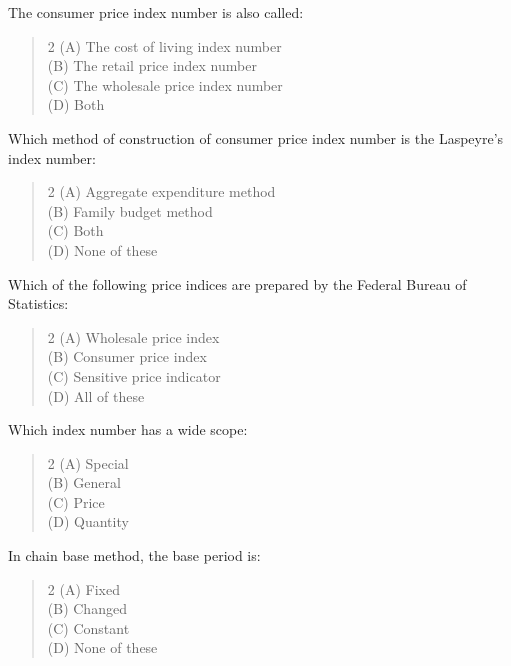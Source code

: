 \documentclass[11pt,a4paper]{article}
\begin{document}
\begin{mcqlist}
\item The consumer price index number is also called:
\begin{quote}\begin{multicols}{2}
\noindent (A) The cost of living index number \\
(B) The retail price index number \\
(C) The wholesale price index number \\
(D) Both
\end{multicols}\end{quote}

\item Which method of construction of consumer price index number is the Laspeyre's index number:
\begin{quote}\begin{multicols}{2}
\noindent (A) Aggregate expenditure method \\
(B) Family budget method \\
(C) Both \\
(D) None of these
\end{multicols}\end{quote}

\item Which of the following price indices are prepared by the Federal Bureau of Statistics:
\begin{quote}\begin{multicols}{2}
\noindent (A) Wholesale price index \\
(B) Consumer price index \\
(C) Sensitive price indicator \\
(D) All of these
\end{multicols}\end{quote}

\item Which index number has a wide scope:
\begin{quote}\begin{multicols}{2}
\noindent (A) Special \\
(B) General \\
(C) Price \\
(D) Quantity
\end{multicols}\end{quote}

\item In chain base method, the base period is:
\begin{quote}\begin{multicols}{2}
\noindent (A) Fixed \\
(B) Changed \\
(C) Constant \\
(D) None of these
\end{multicols}\end{quote}


\end{mcqlist}
\end{document}
